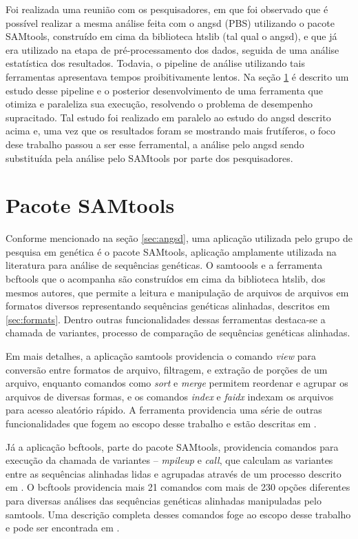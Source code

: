 \documentclass[cic,tc]{iiufrgs}
\begin{document}
Foi realizada uma reunião com os pesquisadores, em que foi observado que é
possível realizar a mesma análise feita com o angsd (PBS) utilizando o pacote
SAMtools, construído em cima da biblioteca htslib (tal qual o angsd), e que já
era utilizado na etapa de pré-processamento dos dados, seguida de uma análise
estatística dos resultados. Todavia, o pipeline de análise utilizando tais
ferramentas apresentava tempos proibitivamente lentos. Na seção
\ref{sec:SAMtools} é descrito um estudo desse pipeline e o posterior
desenvolvimento de uma ferramenta que otimiza e paraleliza sua execução,
resolvendo o problema de desempenho supracitado. Tal estudo foi realizado em
paralelo ao estudo do angsd descrito acima e, uma vez que os resultados foram
se mostrando mais frutíferos, o foco dese trabalho passou a ser esse
ferramental, a análise pelo angsd sendo substituída pela análise pelo SAMtools
por parte dos pesquisadores.

\section{Pacote SAMtools}
\label{sec:SAMtools}

Conforme mencionado na seção \ref{sec:angsd}, uma aplicação utilizada pelo
grupo de pesquisa em genética é o pacote SAMtools,\cite{li2009sequence}
aplicação amplamente utilizada na literatura para análise de sequências
genéticas.\cite{danecek2021twelve} O samtoools e a ferramenta bcftools que o
acompanha são construídos em cima da biblioteca htslib, dos mesmos autores, que
permite a leitura e manipulação de arquivos de arquivos em formatos diversos
representando sequências genéticas alinhadas, descritos em \ref{sec:formats}.
Dentro outras funcionalidades dessas ferramentas destaca-se a chamada de
variantes, processo de comparação de sequências genéticas
alinhadas.\cite{danecek2021twelve}

Em mais detalhes, a aplicação samtools providencia o comando \textit{view} para
conversão entre formatos de arquivo, filtragem, e extração de porções de um
arquivo, enquanto comandos como \textit{sort} e \textit{merge} permitem
reordenar e agrupar os arquivos de diversas formas, e os comandos
\textit{index} e \textit{faidx} indexam os arquivos para acesso aleatório
rápido. A ferramenta providencia uma série de outras funcionalidades que fogem
ao escopo desse trabalho e estão descritas em \cite{danecek2021twelve}.

Já a aplicação bcftools, parte do pacote SAMtools, providencia comandos para
execução da chamada de variantes -- \textit{mpileup} e \textit{call}, que
calculam as variantes entre as sequências alinhadas lidas e agrupadas através
de um processo descrito em \cite{li2011improving}. O bcftools providencia mais
21 comandos com mais de 230 opções diferentes para diversas análises das
sequências genéticas alinhadas manipuladas pelo samtools. Uma descrição
completa desses comandos foge ao escopo desse trabalho e pode ser encontrada em
\cite{danecek2021twelve}.
\end{document}
